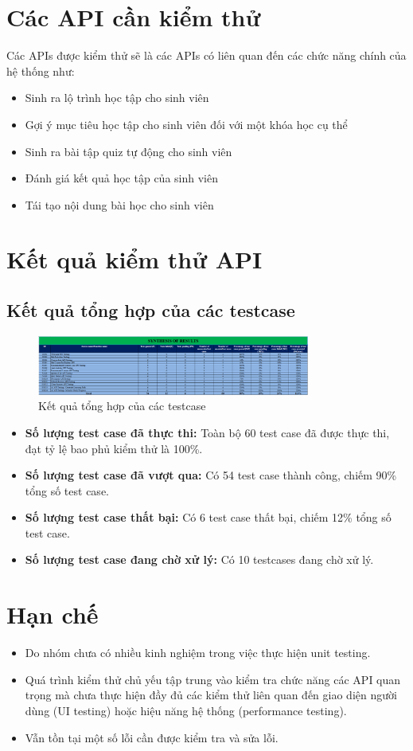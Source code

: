 \section{Các API cần kiểm thử}
Các APIs được kiểm thử sẽ là các APIs có liên quan đến các chức năng chính của hệ thống như:
\begin{itemize}
	\item Sinh ra lộ trình học tập cho sinh viên
	\item Gợi ý mục tiêu học tập cho sinh viên đối với một khóa học cụ thể
	\item Sinh ra bài tập quiz tự động cho sinh viên
	\item Đánh giá kết quả học tập của sinh viên
	\item Tái tạo nội dung bài học cho sinh viên
\end{itemize}

\section{Kết quả kiểm thử API}
\subsection{Kết quả tổng hợp của các testcase}
\begin{figure}[H]
	\centering
	\includegraphics[width=0.8\textwidth]{Images/test/synthesisResults.png}
	\caption{Kết quả tổng hợp của các testcase}
\end{figure}
\begin{itemize}
	\item \textbf{Số lượng test case đã thực thi:} Toàn bộ 60 test case đã được thực thi, đạt tỷ lệ bao phủ kiểm thử là 100\%.
	\item \textbf{Số lượng test case đã vượt qua:} Có 54 test case thành công, chiếm 90\% tổng số test case.
	\item \textbf{Số lượng test case thất bại:} Có 6 test case thất bại, chiếm 12\% tổng số test case.
	\item \textbf{Số lượng test case đang chờ xử lý:} Có 10 testcases đang chờ xử lý.
\end{itemize}

\section{Hạn chế}
\begin{itemize}
	\item Do nhóm chưa có nhiều kinh nghiệm trong việc thực hiện unit testing.
	\item Quá trình kiểm thử chủ yếu tập trung vào kiểm tra chức năng các API quan trọng mà chưa thực hiện đầy đủ các kiểm thử liên quan đến giao diện người dùng (UI testing) hoặc hiệu năng hệ thống (performance testing).
	\item Vẫn tồn tại một số lỗi cần được kiểm tra và sửa lỗi.
\end{itemize}
